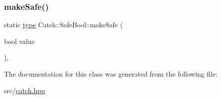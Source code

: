 \subsubsection{\texorpdfstring{make\+Safe()}{makeSafe()}}
{\footnotesize\ttfamily static \hyperlink{class_catch_1_1_safe_bool_a39eef9baed296299d625a54d54a2a958}{type} Catch\+::\+Safe\+Bool\+::make\+Safe (\begin{DoxyParamCaption}\item[{bool}]{value }\end{DoxyParamCaption})\hspace{0.3cm}{\ttfamily [inline]}, {\ttfamily [static]}}



The documentation for this class was generated from the following file\+:\begin{DoxyCompactItemize}
\item 
src/\hyperlink{catch_8hpp}{catch.\+hpp}\end{DoxyCompactItemize}
